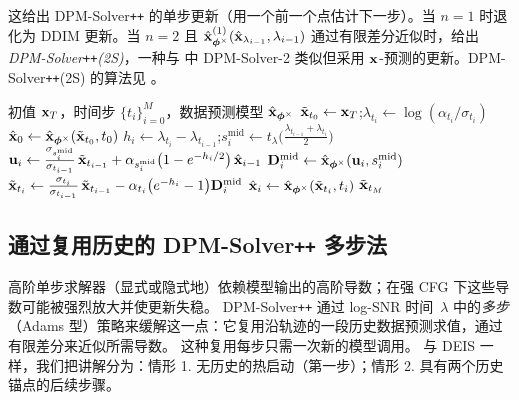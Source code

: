 这给出 DPM-Solver\texttt{++} 的单步更新（用一个前一个点估计下一步）。当 $n=1$ 时退化为 DDIM 更新。当 $n=2$ 且 $\hat{{\mathbf{x}}}_{{\bm{\phi}}^\times}^{(1)}(\hat{{\mathbf{x}}}_{\lambda_{i-1}}, \lambda_{i-1})$ 通过有限差分近似时，给出 \emph{DPM-Solver\texttt{++}(2S)}，一种与  中 DPM-Solver-2 类似但采用 ${\mathbf{x}}$-预测的更新。DPM-Solver\texttt{++}(2S) 的算法见 。
\begin{algorithm}[H]
    \centering
    \caption{DPM-Solver\texttt{++}(2S)：一种中点特殊情形。}
    \label{alg:dpmpp-2s-mid}
    \begin{algorithmic}[1]
    \Require 初值 ${\mathbf{x}}_T$，时间步 $\{t_i\}_{i=0}^M$，数据预测模型 $\hat{{\mathbf{x}}}_{{\bm{\phi}}^\times}$
    \State $\tilde{{\mathbf{x}}}_{t_0}\gets{\mathbf{x}}_T$;\quad $\lambda_{t_i}\gets \log(\alpha_{t_i}/\sigma_{t_i})$ 
    \State $\hat{{\mathbf{x}}}_0 \gets \hat{{\mathbf{x}}}_{{\bm{\phi}}^\times}(\tilde{{\mathbf{x}}}_{t_0},t_0)$ 
        \State $h_i \gets \lambda_{t_i}-\lambda_{t_{i-1}}$;\quad $s_i^{\text{mid}} \gets t_{\lambda} \Big(\tfrac{\lambda_{t_{i-1}}+\lambda_{t_i}}{2}\Big)$
        \State ${\mathbf{u}}_i \gets \tfrac{\sigma_{s_i^{\text{mid}}}}{\sigma_{t_{i-1}}}\,\tilde{{\mathbf{x}}}_{t_{i-1}}
                 + \alpha_{s_i^{\text{mid}}}\big(1-e^{-h_i/2}\big)\,\hat{{\mathbf{x}}}_{i-1}$ 
        \State ${\mathbf{D}}_i^{\mathrm{mid}} \gets \hat{{\mathbf{x}}}_{{\bm{\phi}}^\times}({\mathbf{u}}_i,s_i^{\text{mid}})$ 
        \State $\tilde{{\mathbf{x}}}_{t_i} \gets \tfrac{\sigma_{t_i}}{\sigma_{t_{i-1}}}\,\tilde{{\mathbf{x}}}_{t_{i-1}}
               - \alpha_{t_i}\big(e^{-h_i}-1\big){\mathbf{D}}_i^{\mathrm{mid}}$ 
        \State $\hat{{\mathbf{x}}}_i \gets \hat{{\mathbf{x}}}_{{\bm{\phi}}^\times}(\tilde{{\mathbf{x}}}_{t_i},t_i)$ 
    \EndFor
    \State \Return $\tilde{{\mathbf{x}}}_{t_M}$
    \end{algorithmic}
\end{algorithm}






\subsection{通过复用历史的 DPM-Solver\texttt{++} 多步法}\label{subsec:dpm-solver++-multi}
高阶单步求解器（显式或隐式地）依赖模型输出的高阶导数；在强 CFG 下这些导数可能被强烈放大并使更新失稳。
DPM-Solver\texttt{++} 通过 log-SNR 时间~$\lambda$ 中的\emph{多步}（Adams 型）策略来缓解这一点：它复用沿轨迹的一段历史数据预测求值，通过有限差分来近似所需导数。
这种复用每步只需一次新的模型调用。
与 DEIS 一样，我们把讲解分为：情形 1. 无历史的热启动（第一步）；情形 2. 具有两个历史锚点的后续步骤。


